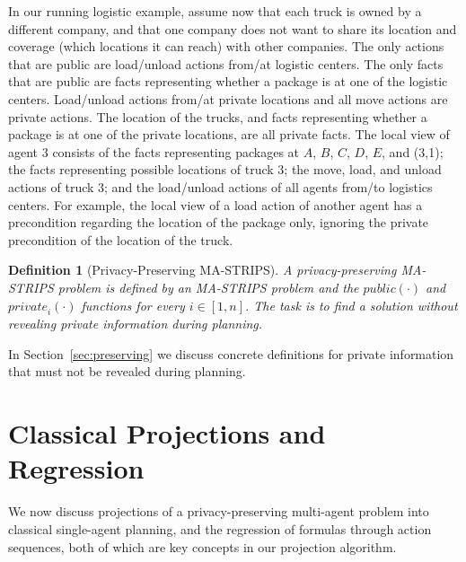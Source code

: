 \documentclass[letterpaper]{article}
\newcommand{\private}[2]{\textit{private}_{#1}(#2)}
\newcommand{\public}{\textit{public}}
\newtheorem{definition}{Definition}
\theoremstyle{definition}
\begin{document}
In our running logistic example, assume now that each truck is owned by a different company, and that one company does not want to share its location and coverage (which locations it can reach) with other companies. 
The only actions that are public are load/unload actions from/at logistic centers. The only facts that are public are facts representing whether a package is at one of the logistic centers. Load/unload actions from/at private locations and all move actions are private actions. The location of the trucks, and facts representing whether a package is at one of the private locations, are all private facts. 
The local view of agent 3 consists of the facts representing 
packages at $A$, $B$, $C$, $D$, $E$, and (3,1);   
the facts representing possible locations of truck $3$; 
the move, load, and unload actions of truck $3$;
and the load/unload actions of all agents from/to logistics centers. 
For example, the local view of a load action of another agent has a precondition regarding the location of the package only, ignoring the private precondition of the location of the truck. 





\begin{definition}[Privacy-Preserving MA-STRIPS]
A privacy-preserving MA-STRIPS problem is defined by an MA-STRIPS problem and the $\public(\cdot)$ and $\private{i}{\cdot}$ functions for every $i\in[1,n]$. The task is to find a solution without revealing private information during planning. 
\label{def:private-ma-strips}
\end{definition}
 
In Section~\ref{sec:preserving} we discuss concrete definitions for private information that must not be revealed during planning.


\section{Classical Projections and Regression}

We now discuss projections of a privacy-preserving multi-agent problem into classical single-agent planning, and the regression of formulas through action sequences, both of which are key concepts in our projection algorithm.
\end{document}
